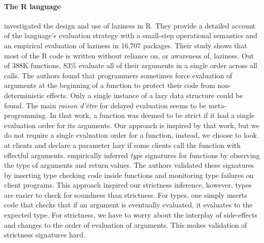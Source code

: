 \documentclass[review,creen,acmsmall]{acmart}
\begin{document}
\paragraph{The R language} \citet{oopsla19b} investigated the design and use of
laziness in R. They provide a detailed account of the language's evaluation
strategy with a small-step operational semantics and an empirical evaluation of
laziness in 16,707 packages. Their study shows that most of the R code is written
without reliance on, or awareness of, laziness. Out of 388K functions, 83\%
evaluate all of their arguments in a single order across all calls. The authors
found that programmers sometimes force evaluation of arguments at the beginning
of a function to protect their code from non-deterministic effects. Only a
single instance of a lazy data structure could be found. The main \emph{raison
d'\^etre} for delayed evaluation seems to be meta-programming. In that work, a
function was deemed to be strict if it had a single evaluation order for its
arguments. Our approach is inspired by that work, but we do not require a single
evaluation order for a function, instead, we choose to look at clients and
declare a parameter lazy if some clients call the function with effectful
arguments. \citet{oopsla20b} empirically inferred \emph{type} signatures for
functions by observing the type of arguments and return values. The authors
validated these signatures by inserting type checking code inside functions and
monitoring type failures on client programs. This approach inspired our strictness
inference, however, types are easier to check for soundness than strictness. For
types, one simply inserts code that checks that if an argument is eventually
evaluated, it evaluates to the expected type. For strictness, we have to worry
about the interplay of side-effects and changes to the order of evaluation of
arguments. This makes validation of strictness signatures hard.
\end{document}
